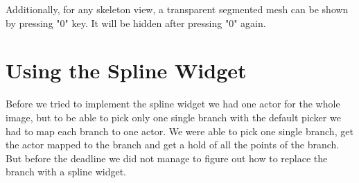 Additionally, for any skeleton view, a transparent segmented mesh can be shown by pressing "0" key. It will be hidden after pressing "0" again.

\section{Using the Spline Widget}
Before we tried to implement the spline widget we had one actor for the whole image, but to be able to pick only one single branch with the default picker we had to map each branch to one actor. We were able to pick one single branch, get the actor mapped to the branch and get a hold of all the points of the branch. But before the deadline we did not manage to figure out how to replace the branch with a spline widget.

